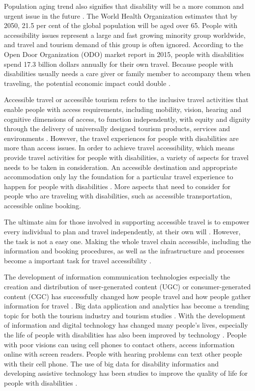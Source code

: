 Population aging trend also signifies that disability will be a more common
and urgent issue in the future \cite{Grue}. The World Health Organization estimates that
by 2050, 21.5 per cent of the global population will be aged over 65. People with
accessibility issues represent a large and fast growing minority group
worldwide, and travel and tourism demand of this group is often ignored. According to the
Open Door Organization (ODO) market report in 2015, people with disabilities spend 17.3
billion dollars annually for their own travel. Because people with disabilities usually
needs a care giver or family member to accompany them when traveling, the potential
economic impact could double \cite{ODO}. 


Accessible travel or accessible tourism refers to the inclusive travel activities that
enable people with access requirements, including mobility, vision, hearing and cognitive
dimensions of access, to function independently, with equity and dignity through the
delivery of universally designed tourism products, services and environments \cite{Ama}.
However, the travel experiences for people with disabilities are more than access
issues. In order to achieve travel accessibility, which means provide travel activities
for people with disabilities, a variety of aspects for travel needs to be taken in
consideration. An accessible destination and appropriate accommodation only lay the 
foundation for a particular travel experience to happen for people with 
disabilities \cite{ODO}. More aspects that need to
consider for people who are traveling with disabilities, such as accessible
transportation, accessible online booking\cite{Ama}.

The ultimate aim for those involved in supporting accessible travel is to empower every
individual to plan and travel independently, at their own will \cite{zhang2016}. However,
the task is not a easy one. Making the whole travel chain accessible, including the
information and booking procedures, as well as the infrastructure and processes become a
important task for travel accessibility \cite{Ama}. 

The development of information communication technologies especially the creation
and distribution of user-generated content (UGC) or consumer-generated content (CGC) has
successfully changed how people travel and how people gather information for travel
\cite{chung2009}. Big data application and analytics has become a trending topic for both
the tourism industry and tourism studies \cite{chung2009}. With the development of 
information and digital technology has changed many people's
lives, especially the life of people with disabilities has also been improved by
technology \cite{GJT14}. People with poor visions can using cell phones to contact
others, access information online with screen readers. People with hearing problems can
text other people with their cell phone. The use of big data for
disability informatics and developing assistive technology has been studies to improve
the quality of life for people with disabilities \cite{Grue}. 

